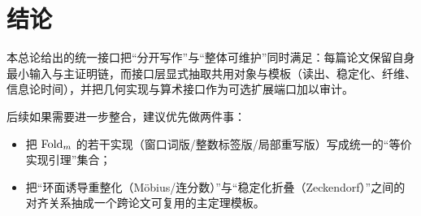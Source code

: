 \section{结论}

本总论给出的统一接口把“分开写作”与“整体可维护”同时满足：每篇论文保留自身最小输入与主证明链，而接口层显式抽取共用对象与模板（读出、稳定化、纤维、信息论时间），并把几何实现与算术接口作为可选扩展端口加以审计。

后续如果需要进一步整合，建议优先做两件事：
\begin{itemize}
  \item 把 $\mathrm{Fold}_m$ 的若干实现（窗口词版/整数标签版/局部重写版）写成统一的“等价实现引理”集合；
  \item 把“环面诱导重整化（Möbius/连分数）”与“稳定化折叠（Zeckendorf）”之间的对齐关系抽成一个跨论文可复用的主定理模板。
\end{itemize}

